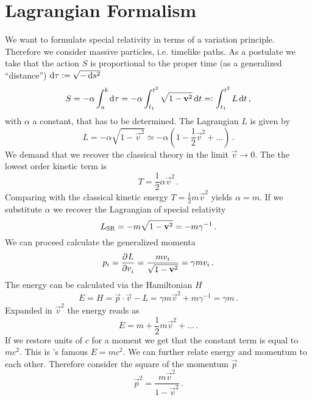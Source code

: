 \section{Lagrangian Formalism}
We want to formulate special relativity in terms of a variation principle.
Therefore we consider massive particles, i.e. timelike paths. As a postulate we
take that the action $S$ is proportional to the proper time (as a generalized
``distance'') $\dif \tau:=\sqrt{-\dif s^2}$
\begin{equation}
    S= -\alpha \int_a^b\dif \tau = -\alpha
    \int_{t_1}^{t^2}\sqrt{1-\vec{v}^2}\dif t =: \int_{t_1}^{t^2}L\dif t\, ,
\end{equation}
with $\alpha$ a constant, that has to be determined. The Lagrangian $L$ is
given by
\begin{equation}
    L=-\alpha\sqrt{1-\vec{v}^2}\simeq
    -\alpha\left(1-\frac{1}{2}\vec{v}^2+\ldots\right) \, .
\end{equation}
We demand that we recover the classical theory in the limit $\vec{v}\to 0$. The
the lowest order kinetic term is
\begin{equation}
    T=\frac{1}{2}\alpha \vec{v}^2\, .
\end{equation}
Comparing with the classical kinetic energy $T=\frac{1}{2}m\vec{v}^2$ yields
$\alpha=m$. If we substitute $\alpha$ we recover the Lagrangian of
special relativity
\begin{equation}
    L\textsubscript{SR}=-m\sqrt{1-\vec{v}^2}=-m\gamma^{-1}\, .
\end{equation}
We can proceed calculate the generalized momenta
\begin{equation}
    p_i=\dpd{L}{v_i}=\frac{mv_i}{\sqrt{1-\vec{v}^2}}=\gamma m v_i\, .
\end{equation}
The energy can be calculated via the Hamiltonian $H$
\begin{equation}
    E=H=\vec{p}\cdot\vec{v}-L=\gamma m \vec{v}^2 + m\gamma^{-1} =\gamma m\, .
\end{equation}
Expanded in $\vec{v}^2$ the energy reads as
\begin{equation}
    E=m+\frac{1}{2}m\vec{v}^2+\ldots\, .
\end{equation}
If we restore units of $c$ for a moment we get that the constant term is
equal to $mc^2$. This is 's famous $E=mc^2$.
We can further relate energy and momentum to each other. Therefore consider the
square of the momentum $\vec{p}$
\begin{equation}
    \vec{p}^2=\frac{m\vec{v}^2}{1-\vec{v}^2}\, .
\end{equation}
